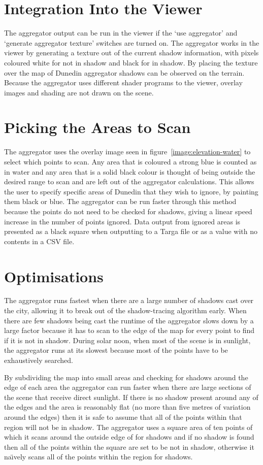 \documentclass[12pt]{report}
\begin{document}
\section{Integration Into the Viewer}
The aggregator output can be run in the viewer if the `use aggregator' and `generate aggregator texture' switches are turned on. The aggregator works in the viewer by generating a texture out of the current shadow information, with pixels coloured white for not in shadow and black for in shadow. By placing the texture over the map of Dunedin aggregator shadows can be observed on the terrain. Because the aggregator uses different shader programs to the viewer, overlay images and shading are not drawn on the scene.

\section{Picking the Areas to Scan}
The aggregator uses the overlay image seen in figure~\ref{image:elevation-water} to select which points to scan. Any area that is coloured a strong blue is counted as in water and any area that is a solid black colour is thought of being outside the desired range to scan and are left out of the aggregator calculations. This allows the user to specify specific areas of Dunedin that they wish to ignore, by painting them black or blue. The aggregator can be run faster through this method because the points do not need to be checked for shadows, giving a linear speed increase in the number of points ignored. Data output from ignored areas is presented as a black square when outputting to a Targa file or as a value with no contents in a CSV file.

\section{Optimisations}
The aggregator runs fastest when there are a large number of shadows cast over the city, allowing it to break out of the shadow-tracing algorithm early. When there are few shadows being cast the runtime of the aggregator slows down by a large factor because it has to scan to the edge of the map for every point to find if it is not in shadow. During solar noon, when most of the scene is in sunlight, the aggregator runs at its slowest because most of the points have to be exhaustively searched.

By subdividing the map into small areas and checking for shadows around the edge of each area the aggregator can run faster when there are large sections of the scene that receive direct sunlight. If there is no shadow present around any of the edges and the area is reasonably flat (no more than five metres of variation around the edges) then it is safe to assume that all of the points within that region will not be in shadow. The aggregator uses a square area of ten points of which it scans around the outside edge of for shadows and if no shadow is found then all of the points within the square are set to be not in shadow, otherwise it na\"{\i}vely scans all of the points within the region for shadows.
\end{document}
